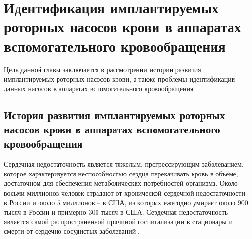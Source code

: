 \chapter{Идентификация имплантируемых роторных насосов крови в аппаратах вспомогательного кровообращения} \label{chapt1}

Цель данной главы заключается в рассмотрении истории развития имплантируемых роторных насосов крови, а также проблемы идентификации данных насосов в аппаратах вспомогательного кровообращения. 




\section{История развития имплантируемых роторных насосов крови в аппаратах вспомогательного кровообращения} \label{chapt1_history}

Сердечная недостаточность является тяжелым, прогрессирующим заболеванием, которое характеризуется неспособностью сердца перекачивать кровь в объеме, достаточном для обеспечения метаболических потребностей организма. Около восьми миллионов человек страдают от хронической сердечной недостаточности в России и около 5 миллионов -- в США, из которых ежегодно умирает около 900 тысяч в России и примерно 300 тысяч в США. Сердечная недостаточность является самой распространенной причиной госпитализации в стационары и смерти от сердечно-сосудистых заболеваний \cite{debakey2000odyssey, starling2011potential, ponikowski2014heart, wong2014epidemiological, selishchev2015ventricular}. 

